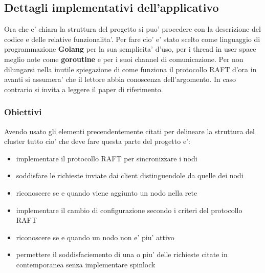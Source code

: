 \subsection{Dettagli implementativi dell'applicativo}
Ora che e' chiara la struttura del progetto si puo' procedere con la descrizione del
codice e delle relative funzionalita'. Per fare cio' e' stato scelto come linguaggio
di programmazione \textbf{Golang} per la sua semplicita' d'uso, per i thread in user space
meglio note come \textbf{goroutine} e per i suoi channel di comunicazione.
Per non dilungarsi nella inutile spiegazione di come funziona il protocollo RAFT d'ora in avanti
si assumera' che il lettore abbia conoscenza dell'argomento. In caso contrario si invita
a leggere il paper di riferimento.
\subsubsection{Obiettivi}
Avendo usato gli elementi precendentemente citati per delineare la struttura del cluster tutto
cio' che deve fare questa parte del progetto e':
\begin{itemize}
    \item implementare il protocollo RAFT per sincronizzare i nodi
    \item soddisfare le richieste inviate dai client distinguendole da quelle dei nodi
    \item riconoscere se e quando viene aggiunto un nodo nella rete
    \item implementare il cambio di configurazione secondo i criteri del protocollo RAFT
    \item riconoscere se e quando un nodo non e' piu' attivo
    \item permettere il soddisfaciemento di una o piu' delle richieste citate in contemporanea 
        senza implementare spinlock
\end{itemize}

